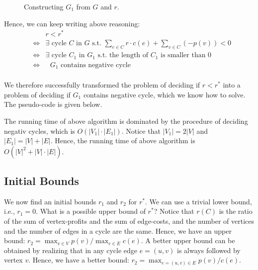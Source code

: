 \begin{figure}[h]
\centering{}
\vspace{-2.6cm}
\caption{Constructing $G_1$ from $G$ and $r$.}
\label{fig:cycle}
\end{figure}


Hence, we can keep writing above reasoning:
\begin{eqnarray*}
& & r < r^* \\
& \Longleftrightarrow & \exists \textrm{ cycle } C \textrm{ in $G$ s.t.\ } \textstyle \sum_{e\in C} r\cdot c(e) + \sum_{v\in C} (-p(v)) < 0 \\
& \Longleftrightarrow & \exists \textrm{ cycle } C_1 \textrm{ in $G_1$ s.t.\ the length of $C_1$ is smaller than 0 } \\
& \Longleftrightarrow & \textrm{ $G_1$ contains negative cycle } \\
\end{eqnarray*}

We therefore successfully transformed the problem of deciding if $r < r^*$ into a problem of deciding if $G_1$ contains negative cycle,
which we know how to solve.
The pseudo-code is given below.

\begin{algorithmblock}[0.8\textwidth]
	\xxx
	\xxx
	\xxx
	\xxx
	\xxx
\end{algorithmblock}

The running time of above algorithm is dominated by the procedure of deciding negativ cycles, which is $O(|V_1|\cdot |E_1|)$.
Notice that $|V_1| = 2|V|$ and $|E_1| = |V| + |E|$. Hence, the running time of above algorithm is $O(|V|^2 + |V| \cdot |E|)$.


\subsection*{Initial Bounds}

We now find an initial bounds $r_1$ and $r_2$ for $r^*$.
We can use a trivial lower bound, i.e., $r_1 = 0$.
What is a possible upper bound of $r^*$?
Notice that $r(C)$ is the ratio of the sum of vertex-profits and the sum of edge-costs,
and the number of vertices and the number of edges in a cycle are the same.
Hence, we have an upper bound: $r_2 = \max_{v\in V} p(v) / \max_{e\in E} c(e)$.
A better upper bound can be obtained by realizing that in any cycle edge $e = (u,v)$ is always followed by vertex $v$.
Hence, we have a better bound: $r_2 = \max_{e = (u,v) \in E} p(v) / c(e)$.


